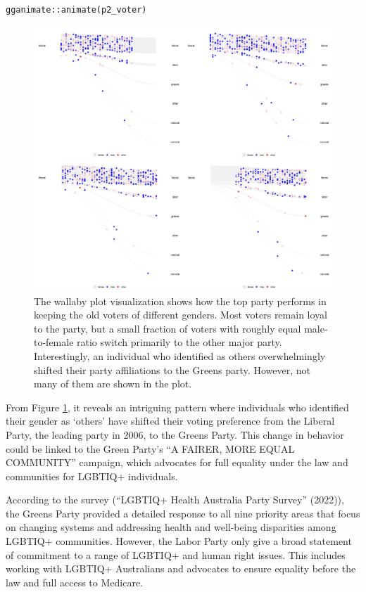 \begin{verbatim}
gganimate::animate(p2_voter)
\end{verbatim}

\begin{figure}

{\centering \includegraphics[width=1\linewidth]{figures/animation-voter} 

}

\caption{The wallaby plot visualization shows how the top party performs in keeping the old voters of different genders. Most voters remain loyal to the party, but a small fraction of voters with roughly equal male-to-female ratio switch primarily to the other major party. Interestingly, an individual who identified as others overwhelmingly shifted their party affiliations to the Greens party. However, not many of them are shown in the plot.}\label{fig:voter-figure}
\end{figure}

From Figure \ref{fig:voter-figure}, it reveals an intriguing pattern where individuals who identified their gender as `others' have shifted their voting preference from the Liberal Party, the leading party in 2006, to the Greens Party. This change in behavior could be linked to the Green Party's ``A FAIRER, MORE EQUAL COMMUNITY'' campaign, which advocates for full equality under the law and communities for LGBTIQ+ individuals.

According to the survey ({``LGBTIQ+ Health Australia Party Survey''} (2022)), the Greens Party provided a detailed response to all nine priority areas that focus on changing systems and addressing health and well-being disparities among LGBTIQ+ communities. However, the Labor Party only give a broad statement of commitment to a range of LGBTIQ+ and human right issues. This includes working with LGBTIQ+ Australians and advocates to ensure equality before the law and full access to Medicare.

